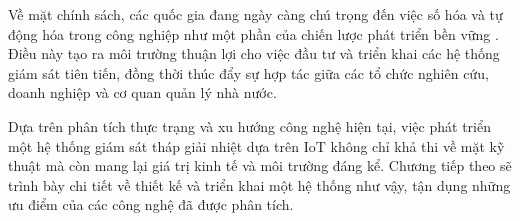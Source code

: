 \documentclass[../main.tex]{subfiles}
\begin{document}
Về mặt chính sách, các quốc gia đang ngày càng chú trọng đến việc số hóa và tự động hóa trong công nghiệp như một phần của chiến lược phát triển bền vững \cite{vietnam2023digital,iea2023digitalization}. Điều này tạo ra môi trường thuận lợi cho việc đầu tư và triển khai các hệ thống giám sát tiên tiến, đồng thời thúc đẩy sự hợp tác giữa các tổ chức nghiên cứu, doanh nghiệp và cơ quan quản lý nhà nước.

Dựa trên phân tích thực trạng và xu hướng công nghệ hiện tại, việc phát triển một hệ thống giám sát tháp giải nhiệt dựa trên IoT không chỉ khả thi về mặt kỹ thuật mà còn mang lại giá trị kinh tế và môi trường đáng kể. Chương tiếp theo sẽ trình bày chi tiết về thiết kế và triển khai một hệ thống như vậy, tận dụng những ưu điểm của các công nghệ đã được phân tích.
\end{document}
